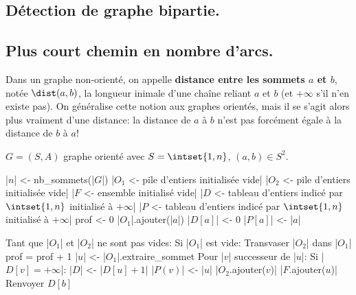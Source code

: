 \documentclass{scrartcl}
\begin{document}
		\subsection{Détection de graphe bipartie.}

		\subsection{Plus court chemin en nombre d'arcs.}
			 Dans un graphe non-orienté, on appelle \textbf{distance entre les sommets $a$ et $b$}, notée $\dist(a,b)$,
			la longueur inimale d'une chaîne reliant $a$ et $b$ (et $+\infty$ s'il n'en existe pas).
			On généralise cette notion aux graphes orientés, mais il se s'agit alors plus vraiment d'une distance: 
			la distance de $a$ à $b$ n'est pas forcément égale à la distance de $b$ à $a$! 

			$G = (S,A)$ graphe orienté avec $S = \intset{1,n}$, $(a,b)\in S^2$.

			\begin{algotext}
				|$n$| <- nb_sommets(|$G$|)
				|$O_1$ <- pile d'entiers initialisée vide|
				|$O_2$ <- pile d'entiers initialisée vide|
				|$F$ <- ensemble initialisé vide|
				|$D$ <- tableau d'entiers indicé par $\intset{1,n}$ initialisé à $+\infty$|
				|$P$ <- tableau d'entiers indicé par $\intset{1,n}$ initialisé à $+\infty$|
				prof <- 0
				|$O_1$|.ajouter(|$a$|)	
				|$D[a]$| <- 0
				|$P[a]$| <- |$a$|

				Tant que |$O_1$| et |$O_2$| ne sont pas vides:
					Si |$O_1$| est vide:
						Transvaser |$O_2$| dans |$O_1$|
						prof = prof + 1
					|$u$| <- |$O_1$|.extraire_sommet
					Pour |$v$| successeur de |$u$|:
						Si |$D[v] = +\infty$|:
							|$D$| <- |$D[u] + 1$|
							|$P(v)$| <- |$u$|
							|$O_2$.ajouter($v$)|
					|$F$.ajouter($u$)|
				Renvoyer $D[b]$
			\end{algotext}
\end{document}
